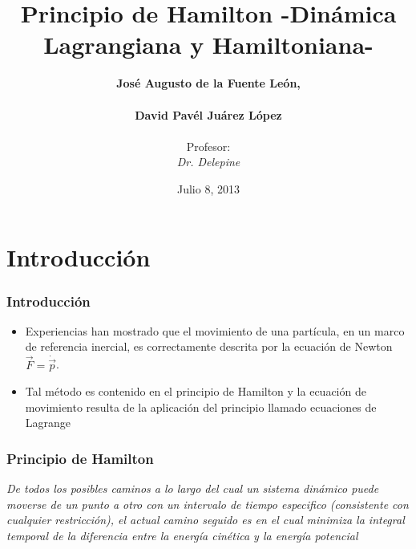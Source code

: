 \documentclass{beamer}
\title{Principio de Hamilton -Dinámica Lagrangiana y Hamiltoniana-}
\author[José Augusto de la Fuente León, \\ David Pavel] {\textbf{José Augusto de la Fuente León, \\ \ \\David Pavél Juárez López}\\ \ \\
Profesor:\\
\emph{Dr. Delepine}}
\date{Julio 8, 2013}
\begin{document}
\begin{frame} 
\titlepage
\end{frame} 




\section[]{Introducción}
\begin{frame}
\frametitle{Introducción}
\justifying
\begin{itemize}
\justifying
\item Experiencias han mostrado que el movimiento de una partícula, en un marco de referencia inercial, es correctamente descrita por la ecuación de Newton $\vec{F} = \dot{\vec{p}}$.
\item Tal método es contenido en el principio de Hamilton  y la ecuación de movimiento resulta de la aplicación del principio llamado ecuaciones de Lagrange
\end{itemize}
 \end{frame}
 
 


\begin{frame}
\justifying
\frametitle{Principio de Hamilton}
\textit{De todos los posibles caminos a lo largo del cual un sistema dinámico puede moverse de un punto a otro con un intervalo de tiempo especifico (consistente con cualquier restricción), el actual camino seguido es en el cual minimiza la integral temporal de la diferencia entre la energía cinética y la energía potencial}
\end{frame}
\end{document}
